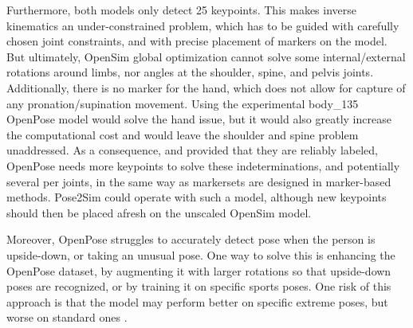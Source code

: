 Furthermore, both models only detect 25 keypoints. This makes inverse kinematics an under-constrained problem, which has to be guided with carefully chosen joint constraints, and with precise placement of markers on the model. But ultimately, OpenSim global optimization cannot solve some internal/external rotations around limbs, nor angles at the shoulder, spine, and pelvis joints. Additionally, there is no marker for the hand, which does not allow for capture of any pronation/supination movement. Using the experimental body\_135 OpenPose model would solve the hand issue, but it would also greatly increase the computational cost and would leave the shoulder and spine problem unaddressed. As a consequence, and provided that they are reliably labeled, OpenPose needs more keypoints to solve these indeterminations, and potentially several per joints, in the same way as markersets are designed in marker-based methods. Pose2Sim could operate with such a model, although new keypoints should then be placed afresh on the unscaled OpenSim model. 

Moreover, OpenPose struggles to accurately detect pose when the person is upside-down, or taking an unusual pose. One way to solve this is enhancing the OpenPose dataset, by augmenting it with larger rotations so that upside-down poses are recognized, or by training it on specific sports poses. One risk of this approach is that the model may perform better on specific extreme poses, but worse on standard ones \cite{Kitamura2022}. 

